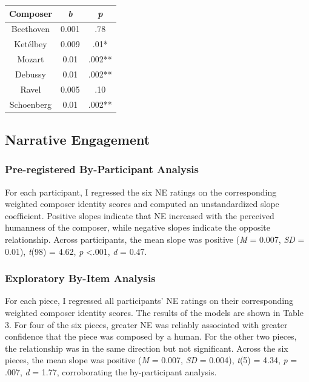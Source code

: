 \documentclass[12pt,twoside]{reedthesis}
\begin{document}
\begin{table}[h]
\centering
\begin{tabular}{c c c}
\toprule
Composer & \emph{b} & \emph{p} \\
\hline
Beethoven & 0.001 & .78 \\
\hline
Ketélbey & 0.009 & .01* \\
\hline
Mozart & 0.01 & .002** \\ 
\hline
Debussy & 0.01 & .002** \\
\hline
Ravel & 0.005 & .10 \\
\hline
Schoenberg & 0.01 & .002** \\
\bottomrule
\end{tabular}\par
\end{table}




\subsection*{Narrative Engagement}
\subsubsection*{Pre-registered By-Participant Analysis}

For each participant, I regressed the six NE ratings on the corresponding weighted composer identity scores and computed an unstandardized slope coefficient. Positive slopes indicate that NE increased with the perceived humanness of the composer, while negative slopes indicate the opposite relationship. Across participants, the mean slope was positive (\emph{M} = 0.007, \emph{SD} = 0.01), \emph{t}(98) = 4.62, \emph{p} \textless .001, \emph{d} = 0.47. 

\subsubsection*{Exploratory By-Item Analysis}

For each piece, I regressed all participants’ NE ratings on their corresponding weighted composer identity scores. The results of the models are shown in Table 3. For four of the six pieces, greater NE was reliably associated with greater confidence that the piece was composed by a human. For the other two pieces, the relationship was in the same direction but not significant. Across the six pieces, the mean slope was positive (\emph{M} = 0.007, \emph{SD} = 0.004), \emph{t}(5) = 4.34, \emph{p} = .007, \emph{d} = 1.77, corroborating the by-participant analysis. 
\end{document}
